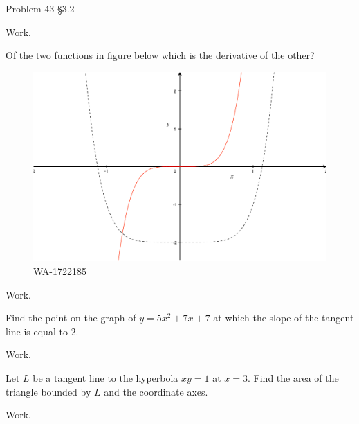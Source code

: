 \documentclass[12pt,addpoints, answers, fleqn]{exam}
\begin{document}
\begin{teacher}
\begin{questions}
Problem 43 \S3.2
\begin{solution}
Work.
\end{solution}


\question 	%


Of the two functions in figure below which is the derivative of the other?
\begin{figure}[htbp] %
   \centering
   \includegraphics[width=5in]{./graphics/1722185.pdf} 
   \caption{WA-1722185}
   \label{fig:1722185}
\end{figure}
\begin{solution}
Work.
\end{solution}

\question 	%

Find the point on the graph of $y = 5x^2 + 7x + 7$ at which the slope of the tangent line is equal to $2$.
\begin{solution}
Work.
\end{solution}

\question 	%

Let $L$ be a tangent line to the hyperbola $xy = 1$ at $x = 3$. Find the area of the triangle bounded by $L$ and the coordinate axes.
 \begin{solution}
Work.
\end{solution}
 
\question 	%


\end{questions}
\end{teacher}
\end{document}
